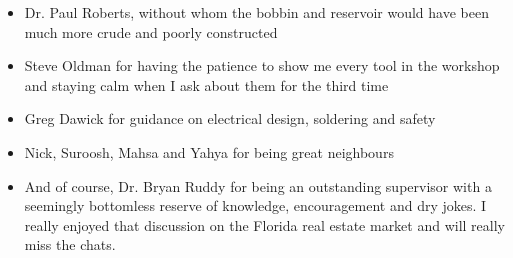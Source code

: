 \documentclass[a4paper,12pt]{article}
\begin{document}
\begin{itemize}
    \item Dr. Paul Roberts, without whom the bobbin and reservoir would have been much more crude and poorly constructed
    \item Steve Oldman for having the patience to show me every tool in the workshop and staying calm when I ask about them for the third time
    \item Greg Dawick for guidance on electrical design, soldering and safety
    \item Nick, Suroosh, Mahsa and Yahya for being great neighbours
    \item And of course, Dr. Bryan Ruddy for being an outstanding supervisor with a seemingly bottomless reserve of knowledge, encouragement and dry jokes. I really enjoyed that discussion on the Florida real estate market and will really miss the chats.
\end{itemize}

\newpage

\tableofcontents

\newpage
\end{document}
